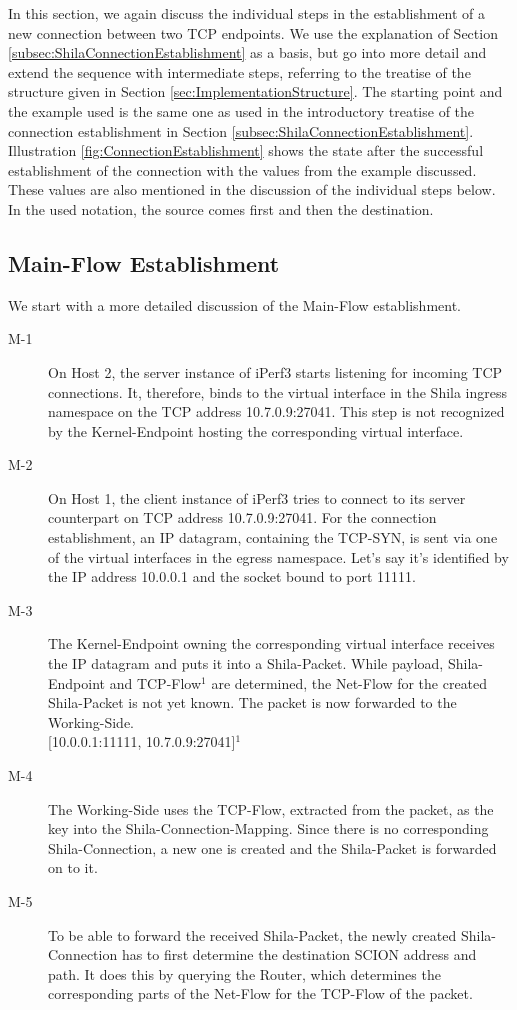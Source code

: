 In this section, we again discuss the individual steps in the establishment of a new connection between two TCP endpoints. We use the explanation of Section \ref{subsec:ShilaConnectionEstablishment} as a basis, but go into more detail and extend the sequence with intermediate steps, referring to the treatise of the structure given in Section \ref{sec:ImplementationStructure}. The starting point and the example used is the same one as used in the introductory treatise of the connection establishment in Section \ref{subsec:ShilaConnectionEstablishment}. Illustration \ref{fig:ConnectionEstablishment} shows the state after the successful establishment of the connection with the values from the example discussed. These values are also mentioned in the discussion of the individual steps below. In the used notation, the source comes first and then the destination.

\subsection{Main-Flow Establishment}

We start with a more detailed discussion of the Main-Flow establishment. 

\begin{description}
	\item[M-1] On Host 2, the server instance of iPerf3 starts listening for incoming TCP connections. It, therefore, binds to the virtual interface in the Shila ingress namespace on the TCP address 10.7.0.9:27041. This step is not recognized by the Kernel-Endpoint hosting the corresponding virtual interface.
	\item[M-2] On Host 1, the client instance of iPerf3 tries to connect to its server counterpart on TCP address 10.7.0.9:27041. For the connection establishment, an IP datagram, containing the TCP-SYN, is sent via one of the virtual interfaces in the egress namespace. Let's say it's identified by the IP address 10.0.0.1 and the socket bound to port 11111.
	\item[M-3] The Kernel-Endpoint owning the corresponding virtual interface receives the IP datagram and puts it into a Shila-Packet. While payload, Shila-Endpoint and TCP-Flow$^{1}$ are determined, the Net-Flow for the created Shila-Packet is not yet known. The packet is now forwarded to the Working-Side.\medskip\\{\small[10.0.0.1:11111, 10.7.0.9:27041]$^{1}$}
	\item[M-4] The Working-Side uses the TCP-Flow, extracted from the packet, as the key into the Shila-Connection-Mapping. Since there is no corresponding Shila-Connection, a new one is created and the Shila-Packet is forwarded on to it.  
	\item[M-5] To be able to forward the received Shila-Packet, the newly created Shila-Connection has to first determine the destination SCION address and path. It does this by querying the Router, which determines the corresponding parts of the Net-Flow for the TCP-Flow of the packet.
\end{description}

